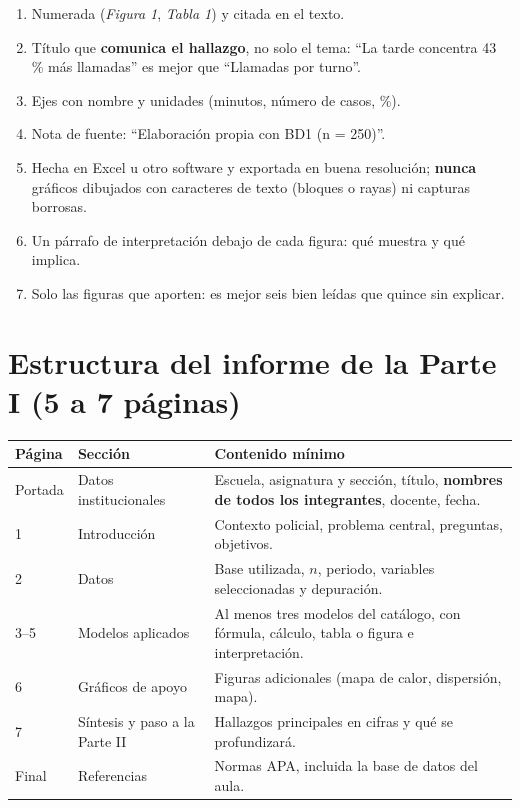 \begin{cajaInfo}
\begin{enumerate}[leftmargin=1.4em,itemsep=1pt]
\item Numerada (\textit{Figura 1}, \textit{Tabla 1}) y citada en el texto.
\item Título que \textbf{comunica el hallazgo}, no solo el tema: ``La tarde concentra 43 \% más llamadas'' es mejor que ``Llamadas por turno''.
\item Ejes con nombre y unidades (minutos, número de casos, \%).
\item Nota de fuente: ``Elaboración propia con BD1 (n = 250)''.
\item Hecha en Excel u otro software y exportada en buena resolución; \textbf{nunca} gráficos dibujados con caracteres de texto (bloques o rayas) ni capturas borrosas.
\item Un párrafo de interpretación debajo de cada figura: qué muestra y qué implica.
\item Solo las figuras que aporten: es mejor seis bien leídas que quince sin explicar.
\end{enumerate}
\end{cajaInfo}

\section{Estructura del informe de la Parte I (5 a 7 páginas)}

\begin{center}
\footnotesize
\begin{tabularx}{\textwidth}{@{}p{1.7cm}p{3.6cm}X@{}}
\toprule
\textbf{Página} & \textbf{Sección} & \textbf{Contenido mínimo}\\
\midrule
Portada & Datos institucionales & Escuela, asignatura y sección, título, \textbf{nombres de todos los integrantes}, docente, fecha.\\
1 & Introducción & Contexto policial, problema central, preguntas, objetivos.\\
2 & Datos & Base utilizada, $n$, periodo, variables seleccionadas y depuración.\\
3--5 & Modelos aplicados & Al menos tres modelos del catálogo, con fórmula, cálculo, tabla o figura e interpretación.\\
6 & Gráficos de apoyo & Figuras adicionales (mapa de calor, dispersión, mapa).\\
7 & Síntesis y paso a la Parte II & Hallazgos principales en cifras y qué se profundizará.\\
Final & Referencias & Normas APA, incluida la base de datos del aula.\\
\bottomrule
\end{tabularx}
\end{center}

